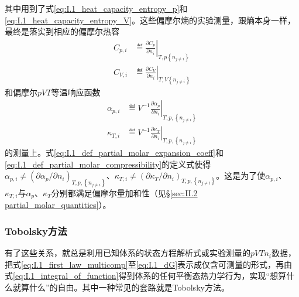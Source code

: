 \documentclass[main.tex]{subfiles}
\begin{document}
其中用到了式\eqref{eq:I.1_heat_capacity_entropy_p}和\eqref{eq:I.1_heat_capacity_entropy_V}。这些偏摩尔熵的实验测量，跟熵本身一样，最终是落实到相应的偏摩尔热容
\begin{align}
  C_{p,i} & \eqdef\left.\frac{\partial C_p}{\partial n_i}\right|_{T,p\left\{n_{j\neq i}\right\}} \label{eq:I.1_def_Cpi} \\
  C_{V,i} & \eqdef\left.\frac{\partial C_V}{\partial n_i}\right|_{T,V\left\{n_{j\neq i}\right\}}\label{eq:I.1_def_CVi}
\end{align}
和偏摩尔$pVT$等温响应函数
\begin{align}
  \alpha_{p,i} & \eqdef V^{-1}\left.\frac{\partial \alpha_p}{\partial n_i}\right|_{T,p,\left\{n_{j\neq i}\right\}}\label{eq:I.1_def_partial_molar_expansion_coeff} \\
  \kappa_{T,i} & \eqdef V^{-1}\left.\frac{\partial \kappa_T}{\partial n_i}\right|_{T,p,\left\{n_{j\neq i}\right\}}\label{eq:I.1_def_partial_molar_compressibility}
\end{align}
的测量上。式\eqref{eq:I.1_def_partial_molar_expansion_coeff}和\eqref{eq:I.1_def_partial_molar_compressibility}的定义式使得$\alpha_{p,i}\neq\left(\partial\alpha_p/\partial n_i\right)_{T,p,\left\{n_{j\neq i}\right\}}$、$\kappa_{T,i}\neq\left(\partial\kappa_T/\partial n_i\right)_{T,p,\left\{n_{j\neq i}\right\}}$。这是为了使$\alpha_{p,i}$、$\kappa_{T,i}$与$\alpha_p$、$\kappa_T$分别都满足偏摩尔量加和性（见\S\ref{sec:II.2 partial_molar_quantities}）。

\subsubsection{Tobolsky方法}
有了这些关系，就总是利用已知体系的状态方程解析式或实验测量的$pVTn_i$数据，把式\eqref{eq:I.1_first_law_multicomp}至\eqref{eq:I.1_dG}表示成仅含可测量的形式，再由式\eqref{eq:I.1_integral_of_function}得到体系的任何平衡态热力学行为，实现“想算什么就算什么”的自由。其中一种常见的套路就是Tobolsky方法。
\end{document}
